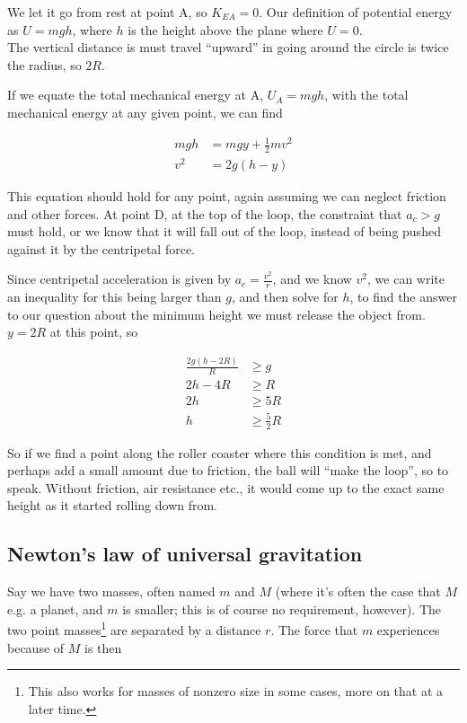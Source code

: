 We let it go from rest at point A, so $K_{EA} = 0$. Our definition of potential energy as $U = m g h$, where $h$ is the height above the plane where $U = 0$.\\
The vertical distance is must travel ``upward'' in going around the circle is twice the radius, so $2R$.

If we equate the total mechanical energy at A, $U_A = m g h$, with the total mechanical energy at any given point, we can find

\begin{align}
m g h &= m g y + \frac{1}{2} m v^2\\
v^2   &= 2g (h - y)
\end{align}

This equation should hold for any point, again assuming we can neglect friction and other forces. At point D, at the top of the loop, the constraint that $a_c > g$ must hold, or we know that it will fall out of the loop, instead of being pushed against it by the centripetal force.

Since centripetal acceleration is given by $\displaystyle a_c = \frac{v^2}{r}$, and we know $v^2$, we can write an inequality for this being larger than $g$, and then solve for $h$, to find the answer to our question about the minimum height we must release the object from.\\
$y = 2 R$ at this point, so

\begin{align}
\frac{2g (h - 2R)}{R} &\ge g\\
2 h - 4R &\ge R\\
2 h &\ge 5R\\
h &\ge \frac{5}{2} R
\end{align}

So if we find a point along the roller coaster where this condition is met, and perhaps add a small amount due to friction, the ball will ``make the loop'', so to speak. Without friction, air resistance etc., it would come up to the exact same height as it started rolling down from.

\subsection{Newton's law of universal gravitation}

Say we have two masses, often named $m$ and $M$ (where it's often the case that $M$ e.g. a planet, and $m$ is smaller; this is of course no requirement, however). The two point masses\footnote{This also works for masses of nonzero size in some cases, more on that at a later time.} are separated by a distance $r$. The force that $m$ experiences because of $M$ is then

